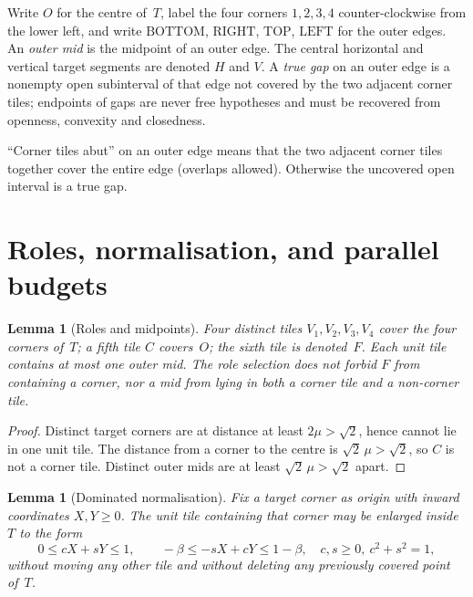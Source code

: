 \documentclass[11pt,reqno]{amsart}
\newtheorem{lemma}[theorem]{Lemma}
\theoremstyle{definition}
\newcommand{\BOTTOM}{\mathrm{BOTTOM}}
\newcommand{\RIGHT}{\mathrm{RIGHT}}
\newcommand{\TOP}{\mathrm{TOP}}
\newcommand{\LEFT}{\mathrm{LEFT}}
\begin{document}
Write $O$ for the centre of~$T$, label the four corners $1,2,3,4$
counter-clockwise from the lower left, and write $\BOTTOM$, $\RIGHT$, $\TOP$,
$\LEFT$ for the outer edges.  An \emph{outer mid} is the midpoint of an outer
edge.  The central horizontal and vertical target segments are denoted $H$ and
$V$.  A \emph{true gap} on an outer edge is a nonempty open subinterval of that
edge not covered by the two adjacent corner tiles; endpoints of gaps are never
free hypotheses and must be recovered from openness, convexity and closedness.

``Corner tiles abut'' on an outer edge means that the two adjacent corner tiles
together cover the entire edge (overlaps allowed).  Otherwise the uncovered
open interval is a true gap.

\section{Roles, normalisation, and parallel budgets}\label{sec:basics}

\begin{lemma}[Roles and midpoints]\label{lem:roles}
Four distinct tiles $V_1,V_2,V_3,V_4$ cover the four corners of~$T$; a fifth
tile $C$ covers~$O$; the sixth tile is denoted~$F$.  Each unit tile contains at
most one outer mid.  The role selection does not forbid $F$ from containing a
corner, nor a mid from lying in both a corner tile and a non-corner tile.
\end{lemma}

\begin{proof}
Distinct target corners are at distance at least $2\mu>\sqrt2$, hence cannot
lie in one unit tile.  The distance from a corner to the centre is
$\sqrt2\,\mu>\sqrt2$, so $C$ is not a corner tile.  Distinct outer mids are at
least $\sqrt2\,\mu>\sqrt2$ apart.
\end{proof}

\begin{lemma}[Dominated normalisation]\label{lem:norm}
Fix a target corner as origin with inward coordinates $X,Y\ge 0$.  The unit
tile containing that corner may be enlarged inside~$T$ to the form
\begin{equation}\label{eq:M2}
0\le cX+sY\le 1,\qquad
-\beta\le -sX+cY\le 1-\beta,
\quad c,s\ge 0,\ c^2+s^2=1,
\end{equation}
without moving any other tile and without deleting any previously covered
point of~$T$.
\end{lemma}
\end{document}
